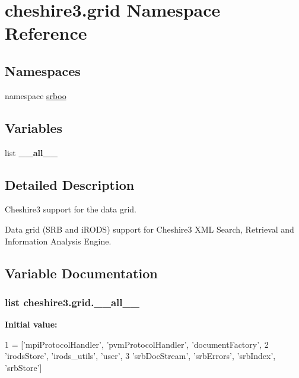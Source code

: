 \hypertarget{namespacecheshire3_1_1grid}{\section{cheshire3.\-grid Namespace Reference}
\label{namespacecheshire3_1_1grid}
}
\subsection*{Namespaces}
\begin{DoxyCompactItemize}
\item 
namespace \hyperlink{namespacecheshire3_1_1grid_1_1srboo}{srboo}
\end{DoxyCompactItemize}
\subsection*{Variables}
\begin{DoxyCompactItemize}
\item 
list {\bfseries \-\_\-\-\_\-all\-\_\-\-\_\-}
\end{DoxyCompactItemize}


\subsection{Detailed Description}
\begin{DoxyVerb}Cheshire3 support for the data grid.

Data grid (SRB and iRODS) support for Cheshire3 XML Search, Retrieval and
Information Analysis Engine.
\end{DoxyVerb}
 

\subsection{Variable Documentation}
\hypertarget{namespacecheshire3_1_1grid_a2e764c152f28736472222b723a1327d7}{
\subsubsection[{\-\_\-\-\_\-all\-\_\-\-\_\-}]{\setlength{\rightskip}{0pt plus 5cm}list cheshire3.\-grid.\-\_\-\-\_\-all\-\_\-\-\_\-}}\label{namespacecheshire3_1_1grid_a2e764c152f28736472222b723a1327d7}
{\bfseries Initial value\-:}
\begin{DoxyCode}
1 = [\textcolor{stringliteral}{'mpiProtocolHandler'}, \textcolor{stringliteral}{'pvmProtocolHandler'}, \textcolor{stringliteral}{'documentFactory'},
2            \textcolor{stringliteral}{'irodsStore'}, \textcolor{stringliteral}{'irods\_utils'}, \textcolor{stringliteral}{'user'},
3            \textcolor{stringliteral}{'srbDocStream'}, \textcolor{stringliteral}{'srbErrors'}, \textcolor{stringliteral}{'srbIndex'}, \textcolor{stringliteral}{'srbStore'}]
\end{DoxyCode}
